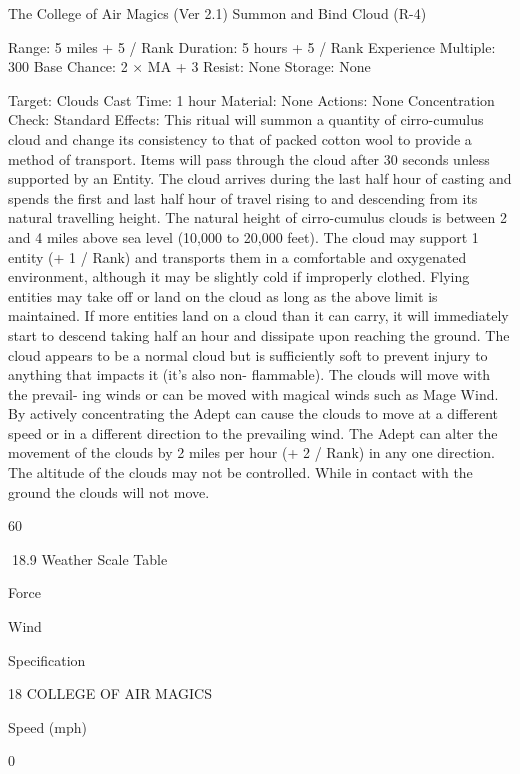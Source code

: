 \begin{Chapter}{The College of Air Magics (Ver 2.1)}
Summon and Bind Cloud (R-4) 

Range: 5 miles + 5 / Rank 
Duration: 5 hours + 5 / Rank 
Experience Multiple: 300 
Base Chance: 2 × MA + 3%
Resist: None 
Storage: None 

Target: Clouds 
Cast Time: 1 hour 
Material: None 
Actions: None 
Concentration Check: Standard 
Effects:  This  ritual  will  summon  a  quantity  of 
cirro-cumulus  cloud  and  change  its  consistency  to 
that of packed cotton wool to provide a method of 
transport.  Items  will  pass  through  the  cloud  after 
30  seconds  unless  supported  by  an  Entity.  The 
cloud  arrives  during  the  last  half  hour  of  casting 
and  spends  the  first  and  last  half  hour  of  travel 
rising to and descending from its natural travelling 
height.  The  natural height  of  cirro-cumulus clouds 
is between 2 and 4 miles above sea level (10,000 to 
20,000 feet). The cloud may support 1 entity (+ 1 / 
Rank)  and  transports  them  in  a  comfortable  and 
oxygenated  environment,  although  it  may  be 
slightly  cold  if  improperly  clothed.  Flying  entities 
may  take  off  or  land  on  the  cloud  as  long  as  the 
above limit is maintained. If more entities land on a 
cloud than it can carry, it will immediately start to 
descend  taking  half  an  hour  and  dissipate  upon 
reaching  the  ground.  The  cloud  appears  to  be  a 
normal  cloud  but  is  sufficiently  soft  to  prevent 
injury  to  anything  that  impacts  it  (it’s  also  non-
flammable). The clouds will move with the prevail-
ing  winds  or  can  be  moved  with  magical  winds 
such as Mage Wind. By actively concentrating the 
Adept  can  cause  the  clouds  to  move  at  a  different 
speed  or  in  a  different  direction  to  the  prevailing 
wind.  The  Adept  can  alter  the  movement  of  the 
clouds by 2 miles per hour (+ 2 / Rank) in any one 
direction.  The  altitude  of  the  clouds  may  not  be 
controlled.  While  in  contact  with  the  ground  the 
clouds will not move.  

 

 

60 

18.9 Weather Scale Table 

Force 

Wind 

Specification 

18 COLLEGE OF AIR MAGICS 

Speed (mph) 

0 


\end{Chapter}
